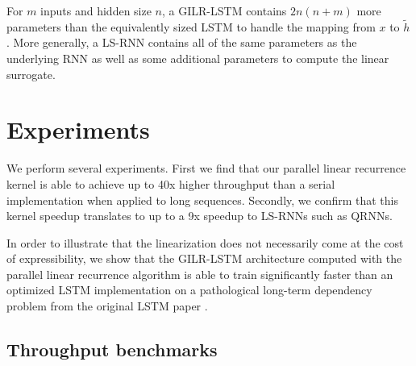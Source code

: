 \documentclass{article}
\begin{document}
For $m$ inputs and hidden size $n$, a GILR-LSTM contains $2n(n+m)$ more
parameters than the equivalently sized LSTM to handle the mapping from $x$ to
$\tilde{h}$. More generally, a LS-RNN contains all of the same parameters as the
underlying RNN as well as some additional parameters to compute the linear
surrogate.

\section{Experiments}
We perform several experiments. First we find that our parallel linear recurrence
kernel is able to achieve up to 40x higher throughput than a serial implementation
when applied to long sequences. Secondly, we confirm that this kernel speedup
translates to up to a 9x speedup to LS-RNNs such as QRNNs.

In order to illustrate that the linearization does not necessarily come at the
cost of expressibility, we show that the GILR-LSTM architecture computed with
the parallel linear recurrence algorithm is able to train significantly faster
than an optimized LSTM implementation on a pathological long-term dependency
problem from the original LSTM paper \citep{hochreiter1997long}.

\subsection{Throughput benchmarks}
\end{document}
